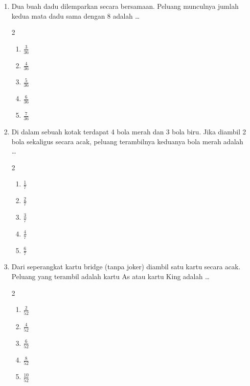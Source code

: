 \documentclass[12pt,a4paper]{article}
\begin{document}
\begin{enumerate}[itemsep=2ex]
    \item Dua buah dadu dilemparkan secara bersamaan. Peluang munculnya jumlah kedua mata dadu sama dengan 8 adalah \dots
    \begin{multicols}{2}
    \begin{enumerate}[label=\Alph*.]
        \item $\frac{3}{36}$
        \item $\frac{4}{36}$
        \item $\frac{5}{36}$
        \item $\frac{6}{36}$
        \item $\frac{7}{36}$
    \end{enumerate}
    \end{multicols}

    \item Di dalam sebuah kotak terdapat 4 bola merah dan 3 bola biru. Jika diambil 2 bola sekaligus secara acak, peluang terambilnya keduanya bola merah adalah \dots
    \begin{multicols}{2}
    \begin{enumerate}[label=\Alph*.]
        \item $\frac{1}{7}$
        \item $\frac{2}{7}$
        \item $\frac{3}{7}$
        \item $\frac{4}{7}$
        \item $\frac{6}{7}$
    \end{enumerate}
    \end{multicols}

    \item Dari seperangkat kartu bridge (tanpa joker) diambil satu kartu secara acak. Peluang yang terambil adalah kartu As atau kartu King adalah \dots
    \begin{multicols}{2}
    \begin{enumerate}[label=\Alph*.]
        \item $\frac{2}{52}$
        \item $\frac{4}{52}$
        \item $\frac{6}{52}$
        \item $\frac{8}{52}$
        \item $\frac{10}{52}$
    \end{enumerate}
    \end{multicols}


\end{enumerate}
\end{document}
